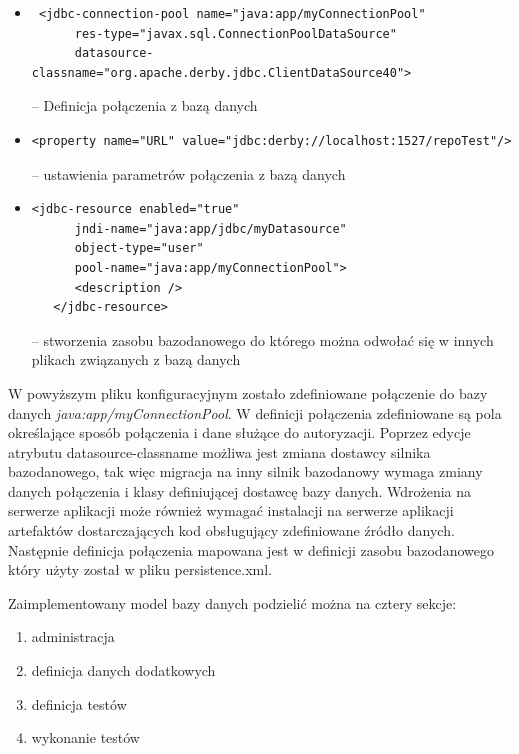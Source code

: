 \begin{itemize}
	\item  {\footnotesize \begin{verbatim} <jdbc-connection-pool name="java:app/myConnectionPool"
      res-type="javax.sql.ConnectionPoolDataSource"
      datasource-classname="org.apache.derby.jdbc.ClientDataSource40"> \end{verbatim}} -- Definicja połączenia z bazą danych
 	\item  {\footnotesize \begin{verbatim}<property name="URL" value="jdbc:derby://localhost:1527/repoTest"/>\end{verbatim}} -- ustawienia parametrów połączenia z bazą danych
 	
 	
 		\item  {\footnotesize \begin{verbatim}<jdbc-resource enabled="true"
      jndi-name="java:app/jdbc/myDatasource"
      object-type="user"
      pool-name="java:app/myConnectionPool">
      <description />
   </jdbc-resource>\end{verbatim}} -- stworzenia zasobu bazodanowego do którego można odwołać się w innych plikach związanych z bazą danych
\end{itemize}

W powyższym pliku konfiguracyjnym zostało zdefiniowane połączenie do bazy danych \textit{java:app/myConnectionPool}. W definicji połączenia zdefiniowane są pola określające sposób połączenia i dane służące do autoryzacji. Poprzez edycje atrybutu datasource-classname możliwa jest zmiana dostawcy silnika bazodanowego, tak więc migracja na inny silnik bazodanowy wymaga zmiany danych połączenia i klasy definiującej dostawcę bazy danych. Wdrożenia na serwerze aplikacji może również wymagać instalacji na serwerze aplikacji artefaktów dostarczających kod obsługujący zdefiniowane źródło danych. Następnie definicja połączenia mapowana jest w definicji zasobu bazodanowego który użyty został w pliku persistence.xml.

  Zaimplementowany model bazy danych podzielić można na cztery sekcje:
  \begin{enumerate}
    \item administracja
    \item definicja danych dodatkowych
    \item definicja testów
    \item wykonanie testów
  \end{enumerate}
  
